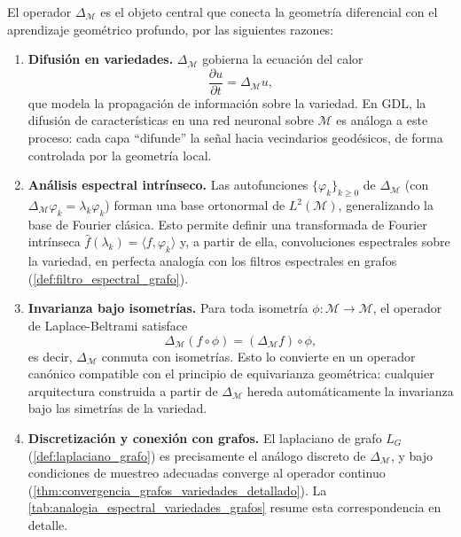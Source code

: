 \begin{remark}\label{rem:laplace_beltrami_gdl}
El operador $\Delta_\mathcal{M}$ es el objeto central que conecta la geometría diferencial con el aprendizaje geométrico profundo, por las siguientes razones:

\begin{enumerate}
    \item \textbf{Difusión en variedades.} $\Delta_\mathcal{M}$ gobierna la ecuación del calor
    \[
    \frac{\partial u}{\partial t} = \Delta_\mathcal{M} u,
    \]
    que modela la propagación de información sobre la variedad. En GDL, la difusión de características en una red neuronal sobre $\mathcal{M}$ es análoga a este proceso: cada capa ``difunde'' la señal hacia vecindarios geodésicos, de forma controlada por la geometría local.

    \item \textbf{Análisis espectral intrínseco.} Las autofunciones $\{\varphi_k\}_{k \geq 0}$ de $\Delta_\mathcal{M}$ (con $\Delta_\mathcal{M} \varphi_k = \lambda_k \varphi_k$) forman una base ortonormal de $L^2(\mathcal{M})$, generalizando la base de Fourier clásica. Esto permite definir una transformada de Fourier intrínseca $\hat{f}(\lambda_k) = \langle f, \varphi_k \rangle$ y, a partir de ella, convoluciones espectrales sobre la variedad, en perfecta analogía con los filtros espectrales en grafos (\autoref{def:filtro_espectral_grafo}).

    \item \textbf{Invarianza bajo isometrías.} Para toda isometría $\phi: \mathcal{M} \to \mathcal{M}$, el operador de Laplace-Beltrami satisface
    \[
    \Delta_\mathcal{M}(f \circ \phi) = (\Delta_\mathcal{M} f) \circ \phi,
    \]
    es decir, $\Delta_\mathcal{M}$ conmuta con isometrías. Esto lo convierte en un operador canónico compatible con el principio de equivarianza geométrica: cualquier arquitectura construida a partir de $\Delta_\mathcal{M}$ hereda automáticamente la invarianza bajo las simetrías de la variedad.

    \item \textbf{Discretización y conexión con grafos.} El laplaciano de grafo $L_G$ (\autoref{def:laplaciano_grafo}) es precisamente el análogo discreto de $\Delta_\mathcal{M}$, y bajo condiciones de muestreo adecuadas converge al operador continuo (\autoref{thm:convergencia_grafos_variedades_detallado}). La \autoref{tab:analogia_espectral_variedades_grafos} resume esta correspondencia en detalle.
\end{enumerate}
\end{remark}

